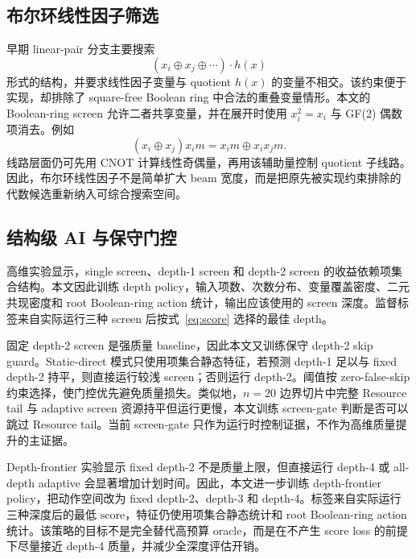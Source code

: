\documentclass[UTF8,fontset=macnew,11pt]{ctexart}
\newcommand{\screen}{Boolean-ring screen}
\newcommand{\xor}{\ensuremath{\oplus}}
\newcommand{\score}{\ensuremath{\mathrm{score}}}
\begin{document}
\subsection{布尔环线性因子筛选}

早期 linear-pair 分支主要搜索
\begin{equation}
  (x_i\xor x_j\xor\cdots)\cdot h(x)
  \label{eq:linear-factor}
\end{equation}
形式的结构，并要求线性因子变量与 quotient $h(x)$ 的变量不相交。该约束便于实现，却排除了 square-free Boolean ring 中合法的重叠变量情形。本文的 \screen{} 允许二者共享变量，并在展开时使用 $x_i^2=x_i$ 与 GF(2) 偶数项消去。例如
\begin{equation}
  (x_i\xor x_j)x_i m = x_i m \xor x_i x_j m .
  \label{eq:boolean-ring}
\end{equation}
线路层面仍可先用 CNOT 计算线性奇偶量，再用该辅助量控制 quotient 子线路。因此，布尔环线性因子不是简单扩大 beam 宽度，而是把原先被实现约束排除的代数候选重新纳入可综合搜索空间。

\subsection{结构级 AI 与保守门控}

高维实验显示，single screen、depth-1 screen 和 depth-2 screen 的收益依赖项集合结构。本文因此训练 depth policy，输入项数、次数分布、变量覆盖密度、二元共现密度和 root Boolean-ring action 统计，输出应该使用的 screen 深度。监督标签来自实际运行三种 screen 后按式~\eqref{eq:score} 选择的最佳 depth。

固定 depth-2 screen 是强质量 baseline，因此本文又训练保守 depth-2 skip guard。Static-direct 模式只使用项集合静态特征，若预测 depth-1 足以与 fixed depth-2 持平，则直接运行较浅 screen；否则运行 depth-2。阈值按 zero-false-skip 约束选择，使门控优先避免质量损失。类似地，$n=20$ 边界切片中完整 Resource tail 与 adaptive screen 资源持平但运行更慢，本文训练 screen-gate 判断是否可以跳过 Resource tail。当前 screen-gate 只作为运行时控制证据，不作为高维质量提升的主证据。

Depth-frontier 实验显示 fixed depth-2 不是质量上限，但直接运行 depth-4 或 all-depth adaptive 会显著增加计划时间。因此，本文进一步训练 depth-frontier policy，把动作空间改为 fixed depth-2、depth-3 和 depth-4。标签来自实际运行三种深度后的最低 \score{}，特征仍使用项集合静态统计和 root Boolean-ring action 统计。该策略的目标不是完全替代高预算 oracle，而是在不产生 score loss 的前提下尽量接近 depth-4 质量，并减少全深度评估开销。
\end{document}
